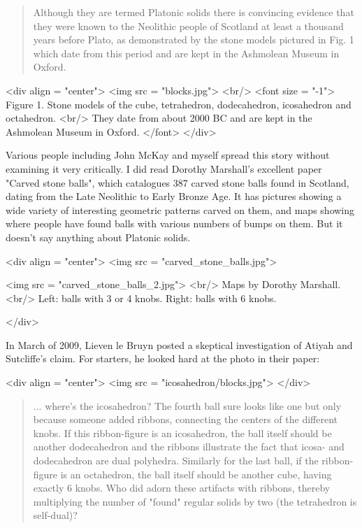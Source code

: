 \begin{quote}
   Although they are termed Platonic solids there is convincing 
   evidence that they were known to the Neolithic people of Scotland 
   at least a thousand years before Plato, as demonstrated by the stone
   models pictured in Fig. 1 which date from this period and are kept 
   in the Ashmolean Museum in Oxford.
\end{quote}

<div align = "center">
<img src = "blocks.jpg">
<br/>
<font size = "-1">
Figure 1.  Stone models of the cube, tetrahedron, dodecahedron,
icosahedron and octahedron. <br/> They date from about 2000 BC and are
kept in the Ashmolean Museum in Oxford.
</font>
</div>

Various people including John McKay and myself spread this story without
examining it very critically.  I did read Dorothy Marshall's excellent
paper "Carved stone balls", which catalogues 387 carved stone balls 
found in Scotland, dating from the Late Neolithic to Early Bronze Age.
It has pictures showing a wide variety of interesting geometric 
patterns carved on them, and maps showing where people have found 
balls with various numbers of bumps on them.  But it doesn't say 
anything about Platonic solids.

<div align = "center">
<img src = "carved_stone_balls.jpg">
  
<img src = "carved_stone_balls_2.jpg">
<br/>
Maps by Dorothy Marshall. <br/>
Left: balls with 3 or 4 knobs.
Right: balls with 6 knobs.

</div>


In March of 2009, Lieven le Bruyn posted a skeptical investigation of 
Atiyah and Sutcliffe's claim.  For starters, he looked hard at the
photo in their paper:

<div align = "center">
<img src = "icosahedron/blocks.jpg">
</div>

\begin{quote}
   ... where's the icosahedron?  The fourth ball sure looks like one 
   but only because someone added ribbons, connecting the centers of 
  the different knobs.  If this ribbon-figure is an icosahedron, the 
  ball itself should be another dodecahedron and the ribbons illustrate
  the fact that icosa- and dodecahedron are dual polyhedra.  Similarly 
  for the last ball, if the ribbon-figure is an octahedron, the ball 
  itself should be another cube, having exactly 6 knobs.  Who did adorn
  these artifacts with ribbons, thereby multiplying the number of 
  "found" regular solids by two (the tetrahedron is self-dual)? 
\end{quote}

